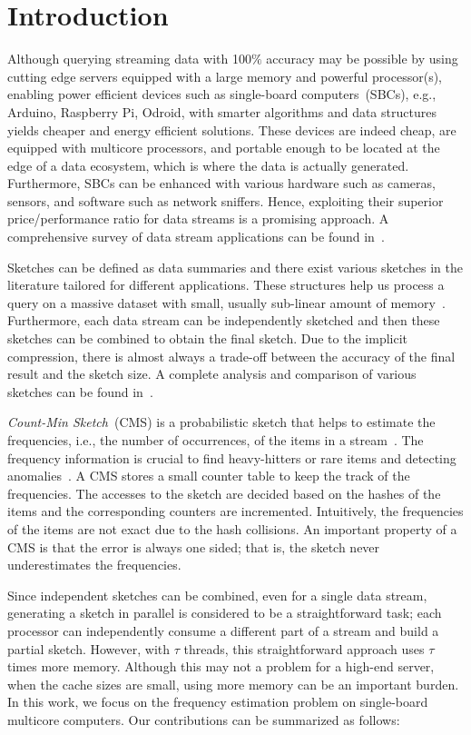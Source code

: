 \documentclass[runningheads]{llncs}
\begin{document}
\section{Introduction}

Although querying streaming data with 100$\%$ accuracy may be possible by using cutting edge servers equipped with a large memory and powerful processor(s), enabling power efficient devices such as single-board computers~(SBCs), e.g., Arduino, Raspberry Pi, Odroid, with smarter algorithms and data structures yields cheaper and energy efficient solutions. These devices are indeed cheap, are equipped with multicore processors, and portable enough to be located at the edge of a data ecosystem, which is where the data is actually generated. Furthermore, SBCs can be enhanced with various hardware such as cameras, sensors, and software such as network sniffers. Hence, exploiting their superior price/performance ratio for data streams is a promising approach. A comprehensive survey of data stream applications can be found in~\cite{muthukrishnan2005}. 
      
Sketches can be defined as data summaries and there exist various sketches in the literature tailored for different applications. These structures help us process a query on a massive dataset with small, usually sub-linear amount of memory~\cite{alon1996,charikar2002,dobra2002,gilbert2002}. Furthermore, each data stream can be independently sketched and then these sketches can be combined to obtain the final sketch. Due to the implicit compression, there is almost always a trade-off between the accuracy of the final result and the sketch size. A complete analysis and comparison of various sketches can be found in~\cite{cormode2005}.

{\it Count-Min Sketch}~(CMS) is a probabilistic sketch that helps to estimate the frequencies, i.e., the number of occurrences, of the items in a stream~\cite{cormode2005}. The frequency  information is crucial to find heavy-hitters or rare items and detecting anomalies~\cite{cormode2003,cormode2005}. A CMS stores a small counter table to keep the track of the frequencies. The accesses to the sketch are decided based on the hashes of the items and the corresponding counters are incremented. Intuitively, the frequencies of the items are not exact due to the hash collisions. An important property of a CMS is that the error is always one sided; that is, the sketch never underestimates the frequencies. 

Since independent sketches can be combined, even for a single data stream, generating a sketch in parallel is considered to be a straightforward task; each processor can independently consume a different part of a stream and build a partial sketch. However, with $\tau$ threads, this straightforward approach uses $\tau$ times more memory. Although this may not a problem for a high-end server, when the cache sizes are small, using more memory can be an important burden. In this work, we focus on the frequency estimation problem on single-board multicore computers. Our contributions can be summarized as follows:
\end{document}
